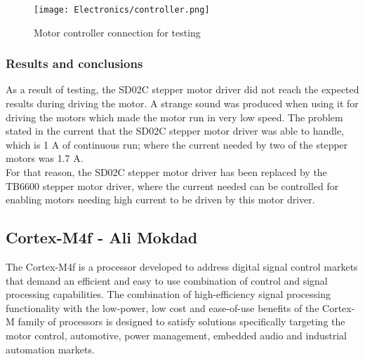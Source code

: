 \begin{figure}[h!]
\centering
\texttt{[image: Electronics/controller.png]}
\caption{Motor controller connection for testing}
\label{Motor controller connection for testing}
\end{figure}%




\subsubsection{Results and conclusions}
As a result of testing, the SD02C stepper motor driver did not reach the expected results during driving the motor. A strange sound was produced when using it for driving the motors which made the motor run in very low speed. The problem stated in the current that the SD02C stepper motor driver was able to handle, which is 1 A of continuous run; where the current needed by two of the stepper motors was 1.7 A.\\
For that reason, the SD02C stepper motor driver has been replaced by the TB6600 stepper motor driver, where the current needed can be controlled for enabling motors needing high current to be driven by this motor driver.

\subsection{Cortex-M4f - Ali Mokdad}
\label{CortexM4}
The Cortex-M4f is a processor developed to address digital signal control markets that demand an efficient and easy to use combination of control and signal processing capabilities. The combination of high-efficiency signal processing functionality with the low-power, low cost and ease-of-use benefits of the Cortex-M family of processors is designed to satisfy solutions specifically targeting the motor control, automotive, power management, embedded audio and industrial automation markets.


